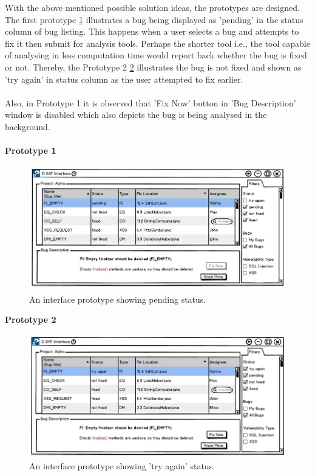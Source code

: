 With the above mentioned possible solution ideas, the prototypes are designed. The first prototype \ref{fig:d_pending} illustrates a bug being displayed as 'pending' in the status column of bug listing. This happens when a user selects a bug and attempts to fix it then submit for analysis tools. Perhaps the shorter tool i.e., the tool capable of analysing in less computation time would report back whether the bug is fixed or not. Thereby, the Prototype 2 \ref{fig:d_tryagain} illustrates the bug is not fixed and shown as 'try again' in status column as the user attempted to fix earlier. \\ \\

Also, in Prototype 1 it is observed that 'Fix Now' button in 'Bug Description' window is disabled which also depicts the bug is being analysed in the background. \\  \\

\textbf{Prototype 1}

\begin{figure}[hbt!]
	\centering
	\includegraphics[width=\linewidth]{figures/d_pending}
	\caption{An interface prototype showing pending status.}
	\label{fig:d_pending}
\end{figure}

\clearpage

\textbf{Prototype 2}

\begin{figure}[hbt!]
	\centering
	\includegraphics[width=\linewidth]{figures/d_tryagain}
	\caption{An interface prototype showing 'try again' status.}
	\label{fig:d_tryagain}
\end{figure}

